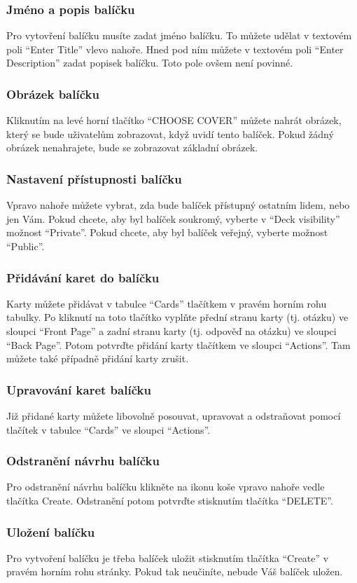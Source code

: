 \documentclass[a4paper,12pt]{article}
\begin{document}
\subsubsection*{Jméno a popis balíčku}
Pro vytovření balíčku musíte zadat jméno balíčku. To můžete udělat v textovém poli \enquote{Enter Title} vlevo nahoře. Hned pod ním můžete v textovém poli \enquote{Enter Description} zadat popisek balíčku. Toto pole ovšem není povinné.
\subsubsection*{Obrázek balíčku}
Kliknutím na levé horní tlačítko \enquote{CHOOSE COVER} můžete nahrát obrázek, který se bude uživatelům zobrazovat, když uvidí tento balíček. Pokud žádný obrázek nenahrajete, bude se zobrazovat základní obrázek.
\subsubsection*{Nastavení přístupnosti balíčku}
Vpravo nahoře můžete vybrat, zda bude balíček přístupný ostatním lidem, nebo jen Vám. Pokud chcete, aby byl balíček soukromý, vyberte v \enquote{Deck visibility} možnost \enquote{Private}. Pokud chcete, aby byl balíček veřejný, vyberte možnost \enquote{Public}.
\subsubsection*{Přidávání karet do balíčku}
Karty můžete přidávat v tabulce \enquote{Cards} tlačítkem v pravém horním rohu tabulky. Po kliknutí na toto tlačítko vyplňte přední stranu karty (tj. otázku) ve sloupci \enquote{Front Page} a zadní stranu karty (tj. odpověď na otázku) ve sloupci \enquote{Back Page}. Potom potvrďte přidání karty tlačítkem ve sloupci \enquote{Actions}. Tam můžete také případně přidání karty zrušit.
\subsubsection*{Upravování karet balíčku}
Již přidané karty můžete libovolně posouvat, upravovat a odstraňovat pomocí tlačítek v tabulce \enquote{Cards} ve sloupci \enquote{Actions}.
\subsubsection*{Odstranění návrhu balíčku}
Pro odstranění návrhu balíčku klikněte na ikonu koše vpravo nahoře vedle tlačítka Create. Odstranění potom potvrďte stisknutím tlačítka \enquote{DELETE}.
\subsubsection*{Uložení balíčku}
Pro vytvoření balíčku je třeba balíček uložit stisknutím tlačítka \enquote{Create} v pravém horním rohu stránky. Pokud tak neučiníte, nebude Váš balíček uložen.
\end{document}
